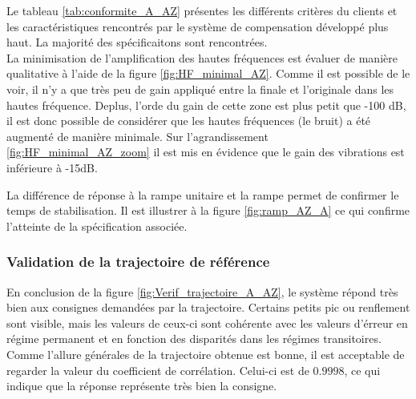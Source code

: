 \documentclass{udes_rapport} %
\begin{document}
Le tableau \ref{tab:conformite_A_AZ} présentes les différents critères du clients et les caractéristiques rencontrés par le système de compensation développé plus haut. La majorité des spécificaitons sont rencontrées.\\
La minimisation de l'amplification des hautes fréquences est évaluer de manière qualitative à l'aide de la figure \ref{fig:HF_minimal_AZ}. Comme il est possible de le voir, il n'y a que très peu de gain appliqué entre la finale et l'originale dans les hautes fréquence. Deplus, l'orde du gain de cette zone est plus petit que -100 dB, il est donc possible de considérer que les hautes fréquences (le bruit) a été augmenté de manière minimale. Sur l'agrandissement \ref{fig:HF_minimal_AZ_zoom} il est mis en évidence que le gain des vibrations est inférieure à -15dB.

La différence de réponse à la rampe unitaire et la rampe permet de confirmer le temps de stabilisation. Il est illustrer à la figure \ref{fig:ramp_AZ_A} ce qui confirme l'atteinte de la spécification associée.

\subsubsection{Validation de la trajectoire de référence} \label{valid_AZ_A}
En conclusion de la figure \ref{fig:Verif_trajectoire_A_AZ}, le système répond très bien aux consignes demandées par la trajectoire. Certains petits pic ou renflement sont visible, mais les valeurs de ceux-ci sont cohérente avec les valeurs d'érreur en régime permanent et en fonction des disparités dans les régimes transitoires. Comme l'allure générales de la trajectoire obtenue est bonne, il est acceptable de regarder la valeur du coefficient de corrélation. Celui-ci est de $0.9998$, ce qui indique que la réponse représente très bien la consigne.
\end{document}
